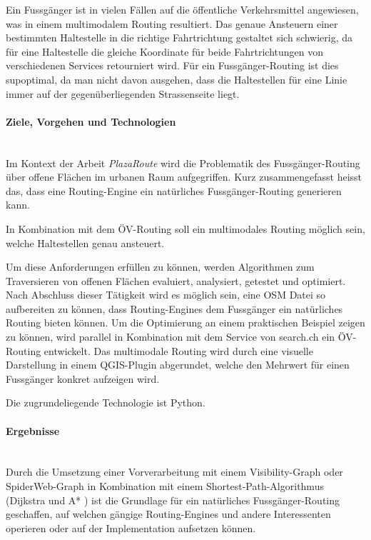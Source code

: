Ein Fussgänger ist in vielen Fällen auf die öffentliche Verkehrsmittel angewiesen, was in einem multimodalem Routing resultiert. Das genaue Ansteuern einer bestimmten Haltestelle in die richtige Fahrtrichtung gestaltet sich schwierig, da für eine Haltestelle die gleiche Koordinate für beide Fahrtrichtungen von verschiedenen Services retourniert wird. Für ein Fussgänger-Routing ist dies supoptimal, da man nicht davon ausgehen, dass die Haltestellen für eine Linie immer auf der gegenüberliegenden Strassenseite liegt.


\paragraph{Ziele, Vorgehen und Technologien}~\\
Im Kontext der Arbeit \emph{PlazaRoute} wird die Problematik des Fussgänger-Routing über offene Flächen im urbanen Raum aufgegriffen. Kurz zusammengefasst heisst das, dass eine Routing-Engine ein natürliches Fussgänger-Routing generieren kann.

In Kombination mit dem ÖV-Routing soll ein multimodales Routing möglich sein, welche Haltestellen genau ansteuert.

Um diese Anforderungen erfüllen zu können, werden Algorithmen zum Traversieren von offenen Flächen evaluiert, analysiert, getestet und optimiert. Nach Abschluss dieser Tätigkeit wird es möglich sein, eine \ac{OSM} Datei so aufbereiten zu können, dass Routing-Engines dem Fussgänger ein natürliches Routing bieten können. Um die Optimierung an einem praktischen Beispiel zeigen zu können, wird parallel in Kombination mit dem Service von search.ch \cite{search_ch_route_api} ein ÖV-Routing entwickelt. Das multimodale Routing wird durch eine visuelle Darstellung in einem QGIS-Plugin abgerundet, welche den Mehrwert für einen Fussgänger konkret aufzeigen wird.

Die zugrundeliegende Technologie ist Python.

\paragraph{Ergebnisse}~\\
Durch die Umsetzung einer Vorverarbeitung mit einem Visibility-Graph oder SpiderWeb-Graph in Kombination mit einem Shortest-Path-Algorithmus (Dijkstra \cite{dijkstra_algorithm} und A* \cite{astar}) ist die Grundlage für ein natürliches Fussgänger-Routing geschaffen, auf welchen gängige Routing-Engines und andere Interessenten operieren oder auf der Implementation aufsetzen können.


